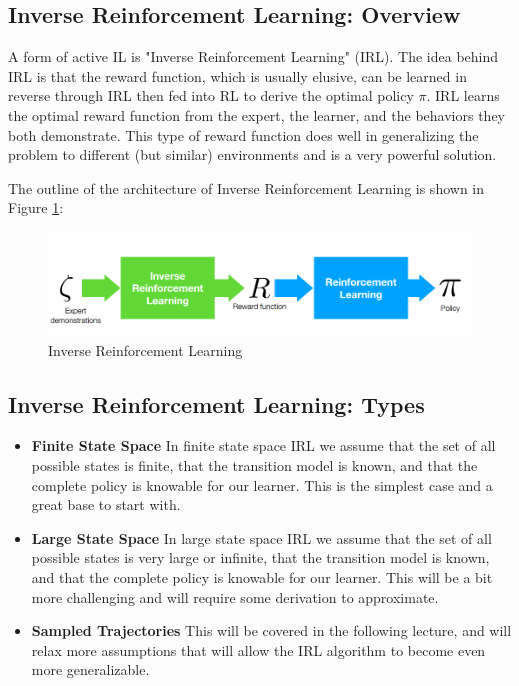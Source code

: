 \documentclass[11pt]{article}
\begin{document}
\subsection{Inverse Reinforcement Learning: Overview}

A form of active IL is "Inverse Reinforcement Learning" (IRL). The idea behind IRL is that the reward function, which is usually elusive, can be learned in reverse through IRL then fed into RL to derive the optimal policy  $\pi$. IRL learns the optimal reward function from the expert, the learner, and the behaviors they both demonstrate. This type of reward function does well in generalizing the problem to different (but similar) environments and is a very powerful solution.

The outline of the architecture of Inverse Reinforcement Learning is shown in Figure \ref{img:irl}:

\begin{figure}[H]
\centering
\includegraphics[width=4.5in]{irl.png}
\caption{Inverse Reinforcement Learning}
\label{img:irl}
\end{figure}

\subsection{Inverse Reinforcement Learning: Types}

\begin{itemize}
    \item \textbf{Finite State Space}
    In finite state space IRL we assume that the set of all possible states is finite, that the transition model is known, and that the complete policy is knowable for our learner. This is the simplest case and a great base to start with.
    
    \item \textbf{Large State Space}
    In large state space IRL we assume that the set of all possible states is very large or infinite, that the transition model is known, and that the complete policy is knowable for our learner. This will be a bit more challenging and will require some derivation to approximate.
    
    \item \textbf{Sampled Trajectories}
    This will be covered in the following lecture, and will relax more assumptions that will allow the IRL algorithm to become even more generalizable.
\end{itemize}
\end{document}
